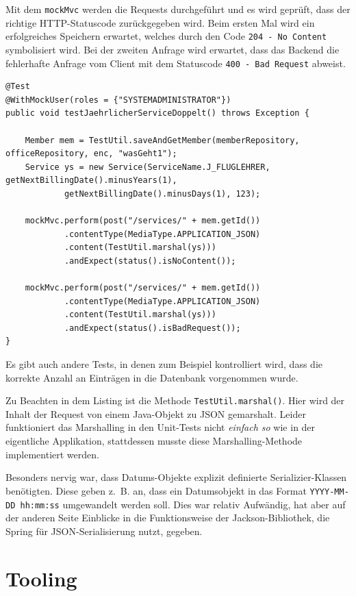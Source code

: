 \documentclass[a4paper, 11pt]{article}
\begin{document}
Mit dem \lstinline{mockMvc} werden die Requests durchgeführt und es wird
geprüft, dass der richtige HTTP-Statuscode zurückgegeben wird. Beim ersten Mal
wird ein erfolgreiches Speichern erwartet, welches durch den Code
\lstinline{204 - No Content} symbolisiert wird. Bei der zweiten Anfrage wird
erwartet, dass das Backend die fehlerhafte Anfrage vom Client mit dem
Statuscode \lstinline{400 - Bad Request} abweist.


\begin{lstlisting}[caption=Beispielhafter Unit-Test, label=lst_test]
@Test
@WithMockUser(roles = {"SYSTEMADMINISTRATOR"})
public void testJaehrlicherServiceDoppelt() throws Exception {

    Member mem = TestUtil.saveAndGetMember(memberRepository, officeRepository, enc, "wasGeht1");
    Service ys = new Service(ServiceName.J_FLUGLEHRER, getNextBillingDate().minusYears(1),
            getNextBillingDate().minusDays(1), 123);

    mockMvc.perform(post("/services/" + mem.getId())
            .contentType(MediaType.APPLICATION_JSON)
            .content(TestUtil.marshal(ys)))
            .andExpect(status().isNoContent());

    mockMvc.perform(post("/services/" + mem.getId())
            .contentType(MediaType.APPLICATION_JSON)
            .content(TestUtil.marshal(ys)))
            .andExpect(status().isBadRequest());
}
\end{lstlisting}

Es gibt auch andere Tests, in denen zum Beispiel kontrolliert wird, dass die
korrekte Anzahl an Einträgen in die Datenbank vorgenommen wurde.

Zu Beachten in dem Listing ist die Methode \lstinline{TestUtil.marshal()}. Hier
wird der Inhalt der Request von einem Java-Objekt zu JSON gemarshalt. Leider
funktioniert das Marshalling in den Unit-Tests nicht \emph{einfach so} wie in
der eigentliche Applikation, stattdessen musste diese Marshalling-Methode
implementiert werden.

Besonders nervig war, dass Datums-Objekte explizit definierte
Serializier-Klassen benötigten. Diese geben z.~B. an, dass ein Datumsobjekt in
das Format \lstinline{YYYY-MM-DD hh:mm:ss} umgewandelt werden soll. Dies war
relativ Aufwändig, hat aber auf der anderen Seite Einblicke in die
Funktionsweise der Jackson-Bibliothek, die Spring für JSON-Serialisierung
nutzt, gegeben.

\section{Tooling}
\end{document}

